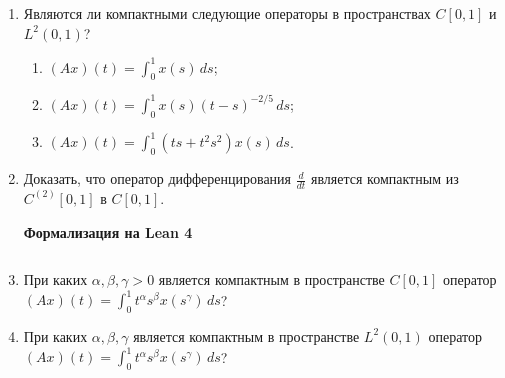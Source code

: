 \documentclass[12pt,a4paper]{article}
\begin{document}
\begin{enumerate}
\begin{center}\small\textbf{Формализация на Lean 4}\end{center}
\inputminted{lean}{FunAn/Section21_CompactOperators/Task09.lean}

\newpage
\item Являются ли компактными следующие операторы в пространствах $C[0,1]$ и $L^{2}(0,1)$?
\begin{enumerate}[label=\alph*)]
\item $(Ax)(t) = \int_{0}^{1} x(s) \, ds$;
\item $(Ax)(t) = \int_{0}^{1} x(s)(t-s)^{-2/5} \, ds$;
\item $(Ax)(t) = \int_{0}^{1} (ts + t^{2}s^{2})x(s) \, ds$.
\end{enumerate}

\newpage
\item Доказать, что оператор дифференцирования $\frac{d}{dt}$ является компактным из $C^{(2)}[0,1]$ в $C[0,1]$.

\begin{center}\small\textbf{Формализация на Lean 4}\end{center}
\inputminted{lean}{FunAn/Section21_CompactOperators/Task11.lean}

\newpage
\item При каких $\alpha, \beta, \gamma > 0$ является компактным в пространстве $C[0,1]$ оператор $(Ax)(t) = \int_{0}^{1} t^{\alpha} s^{\beta} x(s^{\gamma}) \, ds$?

\item При каких $\alpha, \beta, \gamma$ является компактным в пространстве $L^{2}(0,1)$ оператор $(Ax)(t) = \int_{0}^{1} t^{\alpha} s^{\beta} x(s^{\gamma}) \, ds$?
\end{enumerate}
\end{document}
